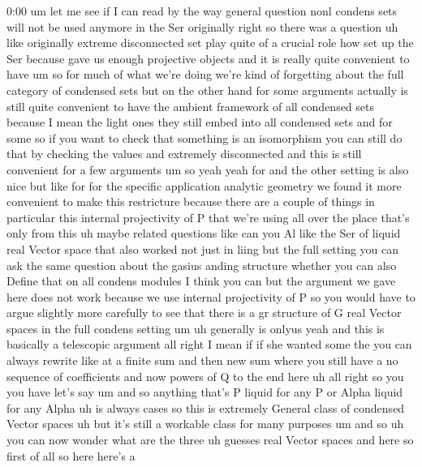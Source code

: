 \begin{unfinished}{0:00}
um  let  me  see  if  I  can  read  by  the  way
general  question  nonl  condens  sets  will
not  be  used  anymore  in  the  Ser
originally  right  so  there  was  a  question
uh  like  originally  extreme  disconnected
set  play  quite  of  a  crucial  role  how  set
up  the  Ser  because  gave  us  enough
projective  objects  and  it  is  really
quite  convenient  to  have
um  so  for  much  of  what  we're  doing  we're
kind  of  forgetting  about  the  full
category  of  condensed  sets  but  on  the
other  hand  for  some  arguments  actually
is  still  quite  convenient  to  have  the
ambient  framework  of  all  condensed  sets
because  I  mean  the  light  ones  they  still
embed  into  all  condensed  sets  and  for
some  so  if  you  want  to  check  that
something  is  an  isomorphism  you  can
still  do  that  by  checking  the  values  and
extremely  disconnected  and  this  is  still
convenient  for  a  few  arguments  um
so
yeah  yeah  for  and  the  other  setting  is
also  nice  but  like  for  for  the  specific
application  analytic  geometry  we  found
it  more  convenient  to  make  this
restricture  because  there  are  a  couple
of  things  in  particular  this  internal
projectivity  of  P  that  we're  using  all
over  the  place  that's  only  from  this
uh  maybe  related  questions  like  can  you
Al  like  the  Ser  of  liquid  real  Vector
space  that  also  worked  not  just  in  liing
but  the  full  setting  you  can  ask  the
same  question  about  the  gasius  anding
structure  whether  you  can  also  Define
that  on  all  condens  modules  I  think  you
can  but  the  argument  we  gave  here  does
not  work  because  we  use  internal
projectivity  of  P  so  you  would  have  to
argue  slightly  more  carefully  to  see
that  there  is  a  gr  structure  of  G  real
Vector  spaces  in  the  full  condens
setting
um
uh  generally  is
onlyus  yeah  and  this  is  basically  a
telescopic
argument
all  right  I  mean  if  if  she  wanted  some
the
you  can  always  rewrite  like  at  a  finite
sum  and  then  new  sum  where  you  still
have  a  no  sequence  of  coefficients  and
now  powers  of  Q  to  the  end
here  uh  all  right  so  you  you
have  let's  say  um
and  so  anything  that's  P  liquid  for  any
P  or  Alpha  liquid  for  any  Alpha  uh  is
always  cases  so  this  is  extremely
General  class  of  condensed  Vector  spaces
uh  but  it's  still  a  workable  class  for
many
purposes  um  and
so  uh  you  can  now  wonder  what  are  the
three  uh  guesses  real  Vector
spaces  and
here
so  first  of  all  so  here  here's  a

\end{unfinished}
